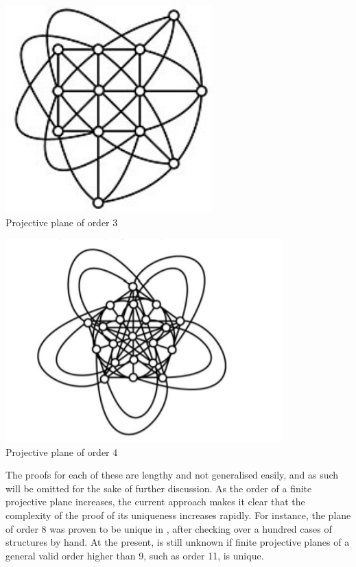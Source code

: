 \documentclass{report}
\theoremstyle{definition}\newtheorem*{definition}{Definition}
\theoremstyle{definition}\newtheorem*{example}{Example}
\theoremstyle{remark}\newtheorem*{remark}{Remark}
\begin{document}
\begin{minipage}{0.5\textwidth}
\begin{center}
\includegraphics[width=0.6\textwidth]{order_3.jpg} \\
Projective plane of order 3
\end{center}
\end{minipage}
\begin{minipage}{0.5\textwidth}
\begin{center}
\includegraphics[width=0.8\textwidth]{order_4.jpg} \\
Projective plane of order 4
\end{center}
\end{minipage}

The proofs for each of these are lengthy and not generalised easily, and as such will be omitted for the sake of further discussion. As the order of a finite projective plane increases, the current approach makes it clear that the complexity of the proof of its uniqueness increases rapidly. For instance, the plane of order 8 was proven to be unique in \cite{order8}, after checking over a hundred cases of structures by hand. At the present, is still unknown if finite projective planes of a general valid order higher than 9, such as order 11, is unique.
\end{document}
